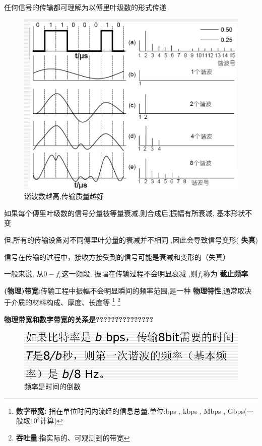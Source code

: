 \documentclass[UTF8,a4paper]{ctexart}
\begin{document}
  任何信号的传输都可理解为以傅里叶级数的形式传递

  \begin{figure}[H]
    \centering
    \includegraphics[scale = 0.3]{assets/jisuanjiwangluo_f186a.png}
    \caption{谐波数越高,传输质量越好}
  \end{figure}

  如果每个傅里叶级数的信号分量被等量衰减,则合成后,振幅有所衰减, 基本形状不变

  但,所有的传输设备对不同傅里叶分量的衰减并不相同 ,因此会导致信号变形( \textbf{失真})

  信号在传输的过程中，接收方接受到的信号可能是衰减和变形的（失真）

  一般来说, 从$0-f_c$这一频段, 振幅在传输过程不会明显衰减 ,则$f_c$称为 \textbf{截止频率}

  \textbf{(物理)带宽}:传输工程中振幅不会明显瞬间的频率范围,是一种 \textbf{物理特性},通常取决于介质的材料构成、厚度、长度等
  \footnote{\textbf{数字带宽:} 指在单位时间内流经的信息总量,单位:bps , kbps , Mbps , Gbps(一般取$10^3$计算)}
  \footnote{\textbf{吞吐量}:指实际的、可观测到的带宽}

  \textbf{物理带宽和数字带宽的关系是???????????????}

  \begin{figure}[H]
    \centering
    \includegraphics[scale = 0.3]{assets/jisuanjiwangluo_ee963.png}
    \caption{频率是时间的倒数}
  \end{figure}
\end{document}
